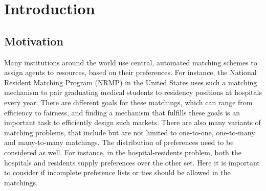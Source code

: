 \section{Introduction}
\label{sec:introduction}

\subsection{Motivation}
Many institutions around the world use central, automated matching schemes to assign agents to resources, based on their preferences. For instance, the National Resident Matching Program (NRMP) in the United States uses such a matching mechanism to pair graduating medical students to residency positions at hospitals every year.\cite{Roth-NRMP} There are different goals for these matchings, which can range from efficiency to fairness, and finding a mechanism that fulfills these goals is an important task to efficiently design such markets.
There are also many variants of matching problems, that include but are not limited to one-to-one, one-to-many and many-to-many matchings. The distribution of preferences need to be considered as well. For instance, in the hospital-residents problem, both the hospitals and residents supply preferences over the other set. Here it is important to consider if incomplete preference lists or ties should be allowed in the matchings. 

